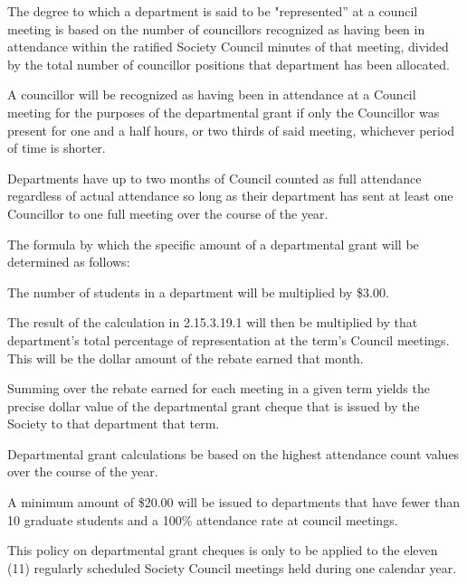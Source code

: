\begin{longenum}[ label*=\thesubsection.\arabic*., align=left]
    \item The degree to which a department is said to be "represented'' at a council meeting is based on the number of councillors recognized as having been in attendance within the ratified Society Council minutes of that meeting, divided by the total number of councillor positions that department has been allocated.
    		\item A councillor will be recognized as having been in attendance at a Council meeting for the purposes of the departmental grant if only the Councillor was present for one and a half hours, or two thirds of said meeting, whichever period of time is shorter.
    		\item Departments have up to two months of Council counted as full attendance regardless of actual attendance so long as their department has sent at least one Councillor to one full meeting over the course of the year.
    \item The formula by which the specific amount of a departmental grant will be determined as follows:
	\begin{longenum}[ label*=\arabic*., align=left]
		\item The number of students in a department will be multiplied by \$3.00. 		
        \item The result of the calculation in 2.15.3.19.1 will then be multiplied by that department's total percentage of representation at the term's Council meetings. This will be the dollar amount of the rebate earned that month.     
        \item Summing over the rebate earned for each meeting in a given term yields the precise dollar value of the departmental grant cheque that is issued by the Society to that department that term.
         \item Departmental grant calculations be based on the highest attendance count values over the course of the year. 
        
    \end{longenum} 
    
    \item A minimum amount of \$20.00 will be issued to departments that have fewer than 10 graduate students and a 100\% attendance rate at council meetings.
    \item This policy on departmental grant cheques is only to be applied to the eleven (11) regularly scheduled Society Council meetings held during one calendar year.
\end{longenum}
